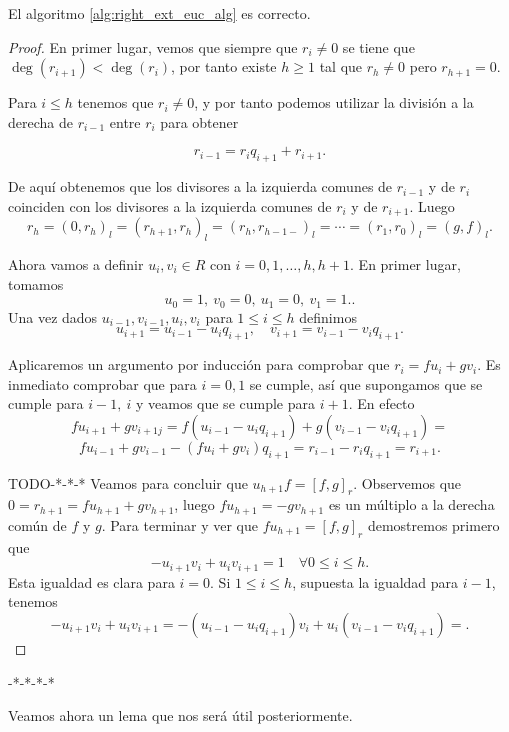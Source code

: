 \begin{theorem}
    El algoritmo  \ref{alg:right_ext_euc_alg} es correcto.
\end{theorem}
\begin{proof}
    En primer lugar, vemos que siempre que \(r_i \neq 0\) se tiene que \(\deg(r_{i+1}) < \deg(r_i)\), por tanto existe  \(h \geq 1\) tal que \(r_h \neq 0\) pero \(r_{h+1} = 0\).

Para \(i \leq h\) tenemos que \(r_i \neq 0\), y por tanto podemos utilizar la división a la derecha de \(r_{i-1}\) entre \(r_i\) para obtener

\[
r_{i-1} = r_i q_{i+1} + r_{i+1}
.\]

De aquí obtenemos que los divisores a la izquierda comunes de \(r_{i-1}\) y de \(r_i\) coinciden con los divisores a la izquierda comunes de  \(r_i\) y de  \(r_{i+1}\). Luego
\[
r_h = (0, r_h)_l = (r_{h+1}, r_h)_l = (r_h, r_{h-1-})_l = \cdots = (r_1, r_0)_l = (g,f)_l
.\]

Ahora vamos a definir \(u_i, v_i \in R\) con \(i = 0,1, \dots, h, h+1\). En primer lugar, tomamos
\[
u_0 = 1,\ v_0 = 0,\ u_1 = 0,\ v_1 = 1.
.\]
Una vez dados \(u_{i-1}, v_{i-1}, u_i, v_i\) para \(1 \leq i \leq h\) definimos
\[
u_{i+1} = u_{i-1} - u_iq_{i+1}, \quad
v_{i+1} = v_{i-1} - v_iq_{i+1}
.\]

Aplicaremos un argumento por inducción para comprobar que \(r_i = fu_i + gv_i\). Es inmediato comprobar que para \(i = 0,1\) se cumple, así que supongamos que se cumple para \(i-1,\ i\) y veamos que se cumple para \(i+1\). En efecto
\[
f u_{i+1} + g v_{i+1j} = f(u_{i-1} - u_iq_{i+1}) + g(v_{i-1} - v_iq_{i+1}) =
\]
\[
f u_{i-1} + g v_{i-1} - (f u_i + g v_i)q_{i+1} = r_{i-1} - r_iq_{i+1} = r_{i+1}
.\]

TODO-*-*-*
Veamos para concluir que \(u_{h+1}f = [f,g]_r\). Observemos que \(0 = r_{h+1} = fu_{h+1} + gv_{h+1}\), luego \(fu_{h+1} = -gv_{h+1}\) es un múltiplo a la derecha común de \(f\) y \(g\). Para terminar y ver que \(f u_{h+1} = [f,g]_r\) demostremos primero que
\[-u_{i+1}v_i + u_iv_{i+1} = 1\quad \forall 0 \leq i \leq h.\]
Esta igualdad es clara para \(i = 0\). Si \(1 \leq i \leq h\), supuesta la igualdad para \(i-1\), tenemos
\[
-u_{i+1}v_i + u_iv_{i+1} = -(u_{i-1} - u_iq_{i+1})v_i + u_i(v_{i-1} - v_iq_{i+1}) =
.\]
\end{proof}
-*-*-*-*

Veamos ahora un lema que nos será útil posteriormente.

